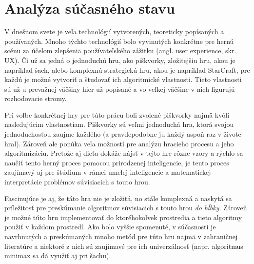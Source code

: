 \section{Analýza súčasného stavu}\label{sec:current-state-analysis}

V dnešnom svete je veľa technológií vytvorených, teoreticky popísaných a používaných.
Mnoho týchto technológií bolo vyvinutých konkrétne pre hernú scénu za účelom zlepšenia používateľského zážitku (angl.
user experience, skr. UX).
Či už sa jedná o jednoduchú hru, ako piškvorky, zložitejšiu hru, akou je napríklad šach, alebo komplexnú strategickú
hru, akou je napríklad StarCraft, pre každú je možné vytvoriť a študovať ich algoritmické vlastnosti.
Tieto vlastnosti sú už u prevažnej väčšiny hier už popísané a vo veľkej väčšine v nich figurujú rozhodovacie stromy.

Pri voľbe konkrétnej hry pre túto prácu boli zvolené piškvorky najmä kvôli nasledujúcim vlastnostiam.
Piškvorky sú veľmi jednoduchá hra, ktorá svojou jednoduchosťou zaujme každého (a pravdepodobne ju každý aspoň raz v
živote hral).
Zároveň ale ponúka veľa možností pre analýzu hracieho procesu a jeho algoritmizáciu.
Pretože aj dieťa dokáže nájsť v tejto hre rôzne vzory a rýchlo sa naučiť tento herný proces pomocou prirodzenej
inteligencie, je tento proces zaujímavý aj pre štúdium v rámci umelej inteligencie a matematickej interpretácie
problémov súvisiacich s touto hrou.

Fascinujúce je aj, že táto hra nie je zložitá, no stále komplexná a naskytá sa príležitosť pre preskúmanie algoritmov
súvisiacich s touto hrou \emph{do hĺbky}.
Zároveň je možné túto hru implementovať do ktoréhokoľvek prostredia a tieto algoritmy použiť v každom prostredí.
Ako bolo vyššie spomenuté, v súčasnosti je navrhnutých a preskúmaných mnoho metód pre túto hru najmä v zahraničnej
literatúre a niektoré z nich sú zaujímavé pre ich univerzálnosť (napr. algoritmus minimax sa dá využiť aj pri šachu).
